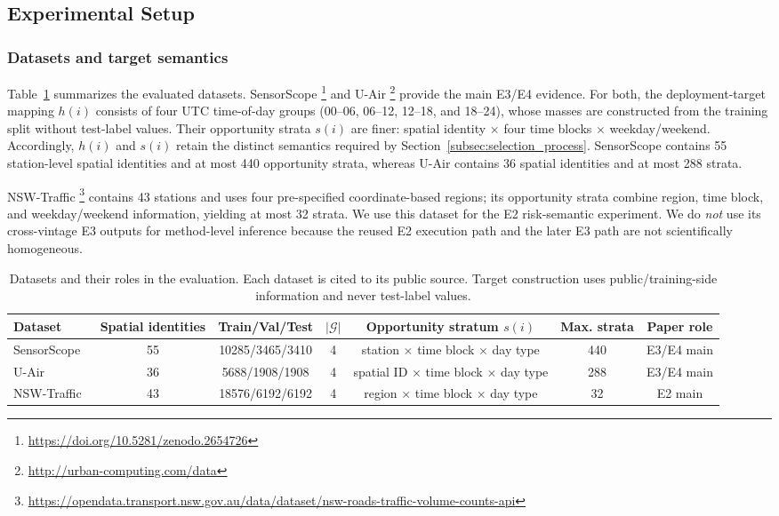 \documentclass[letterpaper,journal]{IEEEtran}
\begin{document}
\subsection{Experimental Setup}
\label{subsec:eval_setup}

\subsubsection{Datasets and target semantics}

Table~\ref{tab:datasets} summarizes the evaluated datasets.  SensorScope
\cite{ingelrest2010sensorscope,barrenetxea2019sensorscope}\footnote{\url{https://doi.org/10.5281/zenodo.2654726}}
and U-Air
\cite{zheng2013uair}\footnote{\url{http://urban-computing.com/data}}
provide the main E3/E4 evidence.  For both, the deployment-target mapping
$h(i)$ consists of four UTC time-of-day groups
(00--06, 06--12, 12--18, and 18--24), whose masses are constructed from the training
split without test-label values.  Their opportunity strata $s(i)$ are finer:
spatial identity $\times$ four time blocks $\times$ weekday/weekend.
Accordingly, $h(i)$ and $s(i)$ retain the distinct semantics required by
Section~\ref{subsec:selection_process}.  SensorScope contains 55 station-level
spatial identities and at most 440 opportunity strata, whereas U-Air contains
36 spatial identities and at most 288 strata.

NSW-Traffic
\cite{tfnsw2024traffic}\footnote{\url{https://opendata.transport.nsw.gov.au/data/dataset/nsw-roads-traffic-volume-counts-api}}
contains 43 stations and uses four pre-specified coordinate-based regions;
its opportunity strata combine region, time block, and weekday/weekend
information, yielding at most 32 strata.  We use this dataset for the E2
risk-semantic experiment.  We do \emph{not} use its cross-vintage E3 outputs for
method-level inference because the reused E2 execution path and the later E3
path are not scientifically homogeneous.

\begin{table}[t]
\centering
\caption{Datasets and their roles in the evaluation.  Each dataset is cited to
its public source.  Target construction uses public/training-side information
and never test-label values.}
\label{tab:datasets}
\setlength{\tabcolsep}{4.5pt}
\begin{tabular}{lcccccc}
\toprule
Dataset & Spatial identities & Train/Val/Test & $|\mathcal G|$ &
Opportunity stratum $s(i)$ & Max. strata & Paper role\\
\midrule
SensorScope~\cite{ingelrest2010sensorscope} & 55 & 10285/3465/3410 & 4 &
station $\times$ time block $\times$ day type & 440 & E3/E4 main\\
U-Air~\cite{zheng2013uair} & 36 & 5688/1908/1908 & 4 &
spatial ID $\times$ time block $\times$ day type & 288 & E3/E4 main\\
NSW-Traffic~\cite{tfnsw2024traffic} & 43 & 18576/6192/6192 & 4 &
region $\times$ time block $\times$ day type & 32 & E2 main\\
\bottomrule
\end{tabular}
\end{table}
\end{document}
